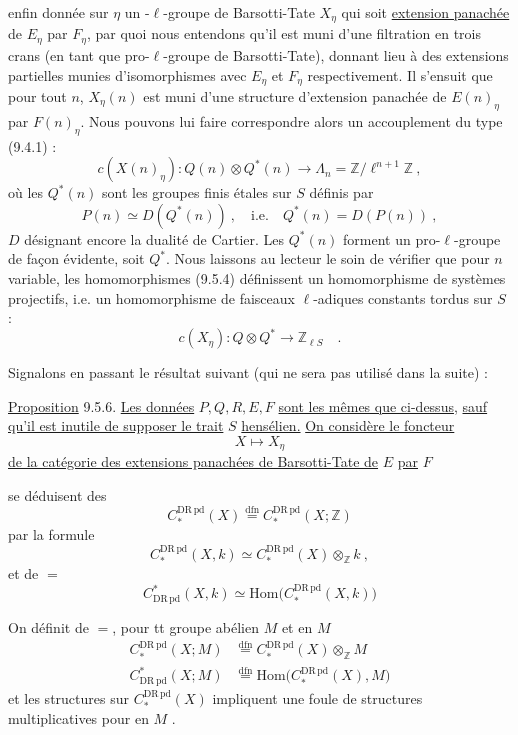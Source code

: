 enfin donnée sur $\eta$ un -$\ell$-groupe de Barsotti-Tate $X_\eta$ qui soit \uline{extension panachée} de $E_\eta$ par $F_\eta$, par quoi nous entendons qu'il est muni d'une filtration en trois crans (en tant que pro-$\ell$-groupe de Barsotti-Tate), donnant lieu à des extensions partielles munies d'isomorphismes avec $E_\eta$ et $F_\eta$ respectivement. Il s'ensuit que pour tout $n$, $X_\eta(n)$ est muni d'une structure d'extension panachée de $E(n)_\eta$ par $F(n)_\eta$. Nous pouvons lui faire correspondre alors un accouplement du type (9.4.1) :
\[
 c(X(n)_\eta):Q(n)\otimes Q^*(n)\longrightarrow\Lambda_n=\mathbb Z/\ell^{n+1}\mathbb Z\ ,\tag*{(9.5.4)}
\]
où les $Q^*(n)$ sont les groupes finis étales sur $S$ définis par
\[
 P(n)\simeq D(Q^*(n))\ ,\quad\text{i.e.}\quad Q^*(n)=D(P(n))\ ,
\]
$D$ désignant encore la dualité de Cartier. Les $Q^*(n)$ forment un pro-$\ell$-groupe de façon évidente, soit $Q^*$. Nous laissons au lecteur le soin de vérifier que pour $n$ variable, les homomorphismes (9.5.4) définissent un homomorphisme de systèmes projectifs, i.e. un homomorphisme de faisceaux $\ell$-adiques constants tordus sur $S$ :
\[
 c(X_\eta):Q\otimes Q^*\longrightarrow\mathbb Z_{\ell S}\quad . \tag*{(9.5.5)}
\]

Signalons en passant le résultat suivant (qui ne sera pas utilisé dans la suite) :

\uline{Proposition} 9.5.6. \uline{Les données} $P,Q,R,E,F$ \uline{sont les mêmes que ci-dessus}, \uline{sauf qu'il est inutile de supposer le trait} $S$ \uline{hensélien.} \uline{On considère le foncteur}
\[
 X\longmapsto X_\eta \tag*{(9.5.6.1)}
\]
\uline{de la catégorie des extensions panachées de Barsotti-Tate de} $E$ \uline{par} $F$

se déduisent des
\[
 C_*^{\mathrm{DR\,pd}}(X)\mathrel{\overset{\mathrm{dfn}}{=}}C_*^{\mathrm{DR\,pd}}(X;\mathbb Z)
\]
par la formule
\[
 C_*^{\mathrm{DR\,pd}}(X,k)\simeq C_*^{\mathrm{DR\,pd}}(X)\otimes_{\mathbb Z}k\ ,
\]
et  de $=$
\[
 C_{\mathrm{DR\,pd}}^*(X,k)\simeq\mathrm{Hom}\bigl(C_*^{\mathrm{DR\,pd}}(X,k)\bigr)
\]

On définit de $=$, pour tt groupe abélien $M$ et  en $M$
\[
\begin{aligned}
 C_*^{\mathrm{DR\,pd}}(X;M)&\mathrel{\overset{\mathrm{dfn}}{=}}C_*^{\mathrm{DR\,pd}}(X)\otimes_{\mathbb Z} M\\
 C_{\mathrm{DR\,pd}}^*(X;M)&\mathrel{\overset{\mathrm{dfn}}{=}}\mathrm{Hom}\bigl(C_*^{\mathrm{DR\,pd}}(X),M\bigr)
\end{aligned}
\]
et les structures sur $C_*^{\mathrm{DR\,pd}}(X)$ impliquent une foule de structures multiplicatives pour  en $M$ \unsure{\ldots}.

